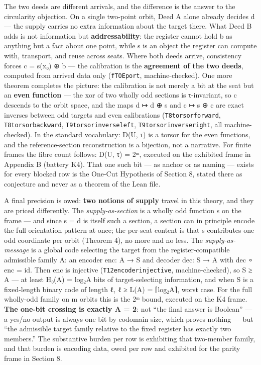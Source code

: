 \documentclass[10pt]{article}
\renewcommand{\_}{\origunderscore\allowbreak}
\begin{document}
The two deeds are different arrivals, and the difference is the answer
to the circularity objection. On a single two-point orbit, Deed A alone
already decides d --- the supply carries no extra information about the
target there. What Deed B adds is not information but
\textbf{addressability}: the register cannot hold b as anything but a
fact about one point, while s is an object the register can compute
with, transport, and reuse across seats. Where both deeds arrive,
consistency forces c = s(x₀) ⊕ b --- the calibration is the
\textbf{agreement of the two deeds}, computed from arrived data only
(\texttt{fTOE\_port}, machine-checked). One more theorem completes the
picture: the calibration is not merely a bit at the seat but an
\textbf{even function} --- the xor of two wholly odd sections is
τ-invariant, so c descends to the orbit space, and the maps d ↦ d ⊕ s
and c ↦ s ⊕ c are exact inverses between odd targets and even
calibrations (\texttt{T8\_torsor\_forward},
\texttt{T8\_torsor\_backward}, \texttt{T9\_torsor\_inverse\_left},
\texttt{T9\_torsor\_inverse\_right}, all machine-checked). In the
standard vocabulary: D(U, τ) is a torsor for the even functions, and the
reference-section reconstruction is a bijection, not a narrative. For
finite frames the fibre count follows: \textbar D(U, τ)\textbar{} = 2ᵐ,
executed on the exhibited frame in Appendix B (battery K4). That one
such bit --- as anchor or as naming --- exists for every blocked row is
the One-Cut Hypothesis of Section 8, stated there as conjecture and
never as a theorem of the Lean file.

A final precision is owed: \textbf{two notions of supply} travel in this
theory, and they are priced differently. The \emph{supply-as-section} is
a wholly odd function s on the frame --- and since s = d is itself such
a section, a section can in principle encode the full orientation
pattern at once; the per-seat content is that s contributes one odd
coordinate per orbit (Theorem 4), no more and no less. The
\emph{supply-as-message} is a global code selecting the target from the
register-compatible admissible family A: an encoder enc: A → S and
decoder dec: S → A with dec ∘ enc = id. Then enc is injective
(\texttt{T12\_encoder\_injective}, machine-checked), so
\textbar S\textbar{} ≥ \textbar A\textbar{} --- at least H₀(A) =
log₂\textbar A\textbar{} bits of target-selecting information, and when
S is a fixed-length binary code of length ℓ, ℓ ≥ L(A) =
⌈log₂\textbar A\textbar⌉, worst case. For the full wholly-odd family on
m orbits this is the 2ᵐ bound, executed on the K4 frame. \textbf{The
one-bit crossing is exactly \textbar A\textbar{} = 2}: not ``the final
answer is Boolean'' --- a yes/no output is always one bit by codomain
size, which proves nothing --- but ``the admissible target family
relative to the fixed register has exactly two members.'' The
substantive burden per row is exhibiting that two-member family, and
that burden is encoding data, owed per row and exhibited for the parity
frame in Section 8.
\end{document}
